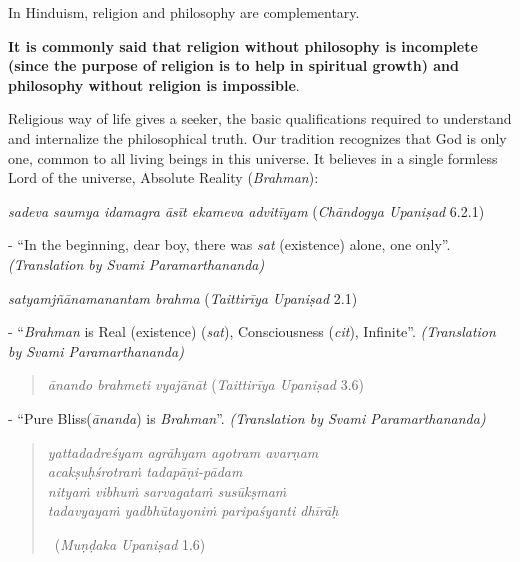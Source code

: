 In Hinduism, religion and philosophy are complementary.

\textbf{It is commonly said that religion without philosophy is incomplete (since the purpose of religion is to help in spiritual growth) and philosophy without religion is impossible}.

Religious way of life gives a seeker, the basic qualifications required to understand and internalize the philosophical truth. Our tradition recognizes that God is only one, common to all living beings in this universe. It believes in a single formless Lord of the universe, Absolute Reality (\textit{Brahman}):

\textit{sadeva saumya idamagra āsīt ekameva advitīyam } (\textit{Chāndogya Upaniṣad} 6.2.1)

\begin{myquote}
- ``In the beginning, dear boy, there was \textit{sat} (existence) alone, one only”. \textit{(Translation by Svami Paramarthananda)}
\end{myquote}

\textit{satyamjñānamanantam brahma } (\textit{Taittirīya Upaniṣad} 2.1)

\begin{myquote}
- ``\textit{Brahman} is Real (existence) (\textit{sat}), Consciousness (\textit{cit}), Infinite''. \textit{(Translation by Svami Paramarthananda)}
\end{myquote}

\begin{verse}
\textit{ānando brahmeti vyajānāt } (\textit{Taittirīya Upaniṣad} 3.6)
\end{verse}

\begin{myquote}
- ``Pure Bliss(\textit{ānanda}) is \textit{Brahman}”. \textit{(Translation by Svami Paramarthananda)}
\end{myquote}

\begin{verse}
\textit{yattadadreśyam agrāhyam agotram avarṇam}\\ \textit{acakṣuḥśrotraṁ tadapāṇi-pādam }\\ \textit{nityaṁ vibhuṁ sarvagataṁ susūkṣmaṁ}\\ \textit{tadavyayaṁ yadbhūtayoniṁ paripaśyanti dhīrāḥ } 

~\hfill (\textit{Muṇḍaka Upaniṣad} 1.6)
\end{verse}

